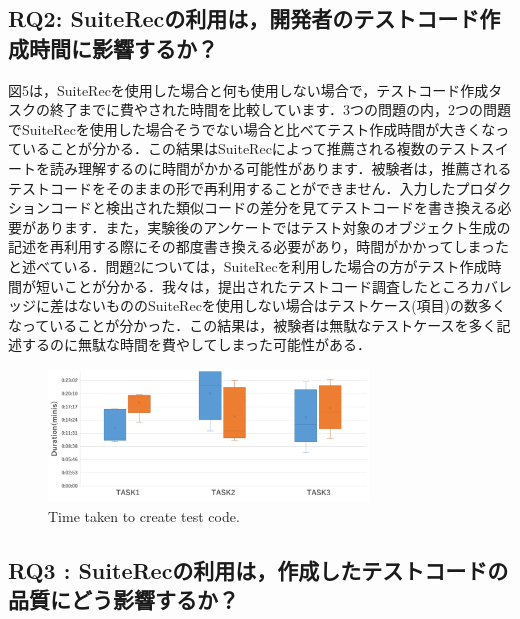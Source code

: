 \documentclass[conference]{IEEEtran}
\begin{document}
\subsection{RQ2: SuiteRecの利用は，開発者のテストコード作成時間に影響するか？}

図5は，SuiteRecを使用した場合と何も使用しない場合で，テストコード作成タスクの終了までに費やされた時間を比較しています．3つの問題の内，2つの問題でSuiteRecを使用した場合そうでない場合と比べてテスト作成時間が大きくなっていることが分かる．この結果はSuiteRecによって推薦される複数のテストスイートを読み理解するのに時間がかかる可能性があります．被験者は，推薦されるテストコードをそのままの形で再利用することができません．入力したプロダクションコードと検出された類似コードの差分を見てテストコードを書き換える必要があります．また，実験後のアンケートではテスト対象のオブジェクト生成の記述を再利用する際にその都度書き換える必要があり，時間がかかってしまったと述べている．問題2については，SuiteRecを利用した場合の方がテスト作成時間が短いことが分かる．我々は，提出されたテストコード調査したところカバレッジに差はないもののSuiteRecを使用しない場合はテストケース(項目)の数多くなっていることが分かった．この結果は，被験者は無駄なテストケースを多く記述するのに無駄な時間を費やしてしまった可能性がある．
\begin{figure}[htbp]
\centerline{\includegraphics[width=8.5cm]{duration.pdf}}
\caption{Time taken to create test code.}
\label{fig}
\end{figure}

\subsection{RQ3 : SuiteRecの利用は，作成したテストコードの品質にどう影響するか？}
\end{document}
